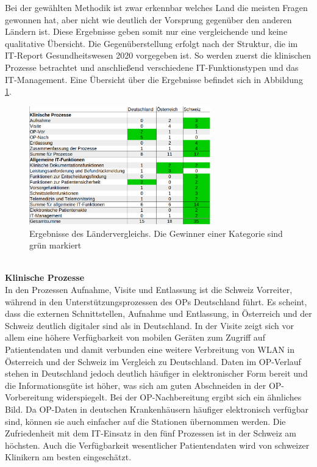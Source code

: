 Bei der gewählten Methodik ist zwar erkennbar welches Land die meisten Fragen gewonnen hat, aber nicht wie deutlich der Vorsprung gegenüber den anderen Ländern ist. Diese Ergebnisse geben somit nur eine vergleichende und keine qualitative Übersicht. Die Gegenüberstellung erfolgt nach der Struktur, die im IT-Report Gesundheitswesen 2020 vorgegeben ist. So werden zuerst die klinischen Prozesse betrachtet und anschließend verschiedene IT-Funktionstypen und das IT-Management. Eine Übersicht über die Ergebnisse befindet sich in Abbildung \ref{fig:laender_ergebnisse}.
\begin{figure}
	\centering
	\includegraphics[width=0.7\textwidth]{Bilder/laendervergleich_ergebnisse.png}
	\caption{Ergebnisse des Ländervergleichs. Die Gewinner einer Kategorie sind grün markiert}
	\label{fig:laender_ergebnisse}
\end{figure}
\vspace{\parheadvspace}\\
\textbf{Klinische Prozesse}\\
In den Prozessen Aufnahme, Visite und Entlassung ist die Schweiz Vorreiter, während in den Unterstützungsprozessen des OPs Deutschland führt. Es scheint, dass die externen Schnittstellen, Aufnahme und Entlassung, in Österreich und der Schweiz deutlich digitaler sind als in Deutschland. In der Visite zeigt sich vor allem eine höhere Verfügbarkeit von mobilen Geräten zum Zugriff auf Patientendaten und damit verbunden eine weitere Verbreitung von WLAN in Österreich und der Schweiz im Vergleich zu Deutschland. Daten im OP-Verlauf stehen in Deutschland jedoch deutlich häufiger in elektronischer Form bereit und die Informationsgüte ist höher, was sich am guten Abschneiden in der OP-Vorbereitung widerspiegelt. Bei der OP-Nachbereitung ergibt sich ein ähnliches Bild. Da OP-Daten in deutschen Krankenhäusern häufiger elektronisch verfügbar sind, können sie auch einfacher auf die Stationen übernommen werden. Die Zufriedenheit mit dem IT-Einsatz in den fünf Prozessen ist in der Schweiz am höchsten. Auch die Verfügbarkeit wesentlicher Patientendaten wird von schweizer Klinikern am besten eingeschätzt.
